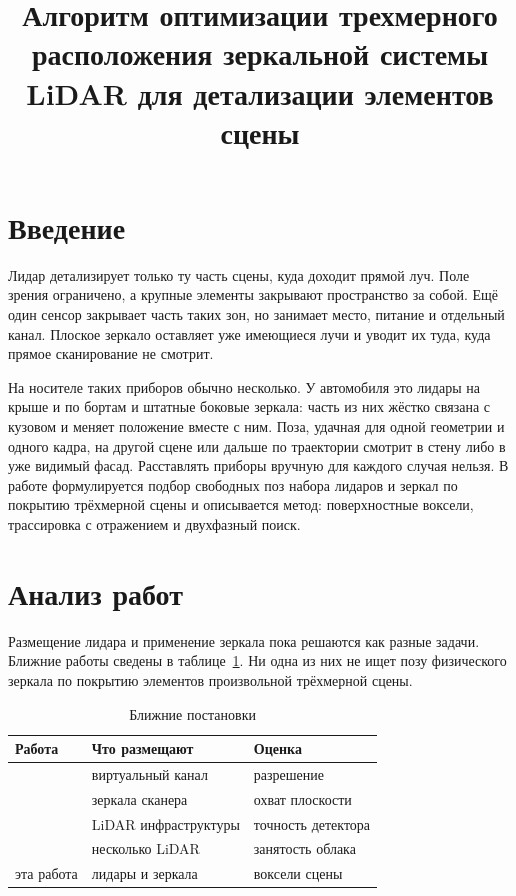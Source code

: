 \documentclass{misisarticle}
\title{Алгоритм оптимизации трехмерного расположения зеркальной системы LiDAR для детализации элементов сцены}
\begin{document}
\maketitle

\section{Введение}

Лидар детализирует только ту часть сцены, куда доходит прямой луч. Поле зрения ограничено, а крупные элементы закрывают пространство за собой. Ещё один сенсор закрывает часть таких зон, но занимает место, питание и отдельный канал. Плоское зеркало оставляет уже имеющиеся лучи и уводит их туда, куда прямое сканирование не смотрит.

На носителе таких приборов обычно несколько. У автомобиля это лидары на крыше и по бортам и штатные боковые зеркала: часть из них жёстко связана с кузовом и меняет положение вместе с ним. Поза, удачная для одной геометрии и одного кадра, на другой сцене или дальше по траектории смотрит в стену либо в уже видимый фасад. Расставлять приборы вручную для каждого случая нельзя. В работе формулируется подбор свободных поз набора лидаров и зеркал по покрытию трёхмерной сцены и описывается метод: поверхностные воксели, трассировка с отражением и двухфазный поиск.

\section{Анализ работ}

Размещение лидара и применение зеркала пока решаются как разные задачи. Ближние работы сведены в таблице~\ref{tab:related}. Ни одна из них не ищет позу физического зеркала по покрытию элементов произвольной трёхмерной сцены.

\begin{table}[htbp]
  \caption{Ближние постановки}
  \label{tab:related}
  \centering
  \footnotesize
  \setlength{\tabcolsep}{3pt}
  \begin{tabular}{@{}lll@{}}
    \toprule
    \textbf{Работа} & \textbf{Что размещают} & \textbf{Оценка} \\
    \toprule
    \cite{vishnevsky2026} & виртуальный канал & разрешение \\
    \cite{li2021} & зеркала сканера & охват плоскости \\
    \cite{cai2023} & LiDAR инфраструктуры & точность детектора \\
    \cite{kini2020} & несколько LiDAR & занятость облака \\
    эта работа & лидары и зеркала & воксели сцены \\
    \bottomrule
  \end{tabular}
\end{table}
\end{document}

